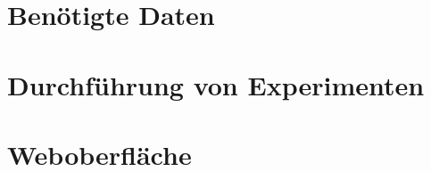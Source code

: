 \begin{appendices}

\section{Benötigte Daten}
\blindtext

\section{Durchführung von Experimenten}
\blindtext

\section{Weboberfläche}
\blindtext
\end{appendices}